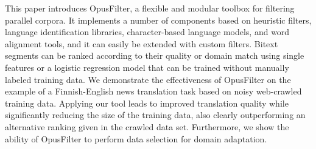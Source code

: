 This paper introduces OpusFilter, a flexible and modular toolbox for filtering parallel corpora. It implements a number of components based on heuristic filters, language identification libraries, character-based language models, and word alignment tools, and it can easily be extended with custom filters. Bitext segments can be ranked according to their quality or domain match using single features or a logistic regression model that can be trained without manually labeled training data. We demonstrate the effectiveness of OpusFilter on the example of a Finnish-English news translation task based on noisy web-crawled training data. Applying our tool leads to improved translation quality while significantly reducing the size of the training data, also clearly outperforming an alternative ranking given in the crawled data set. Furthermore, we show the ability of OpusFilter to perform data selection for domain adaptation.
